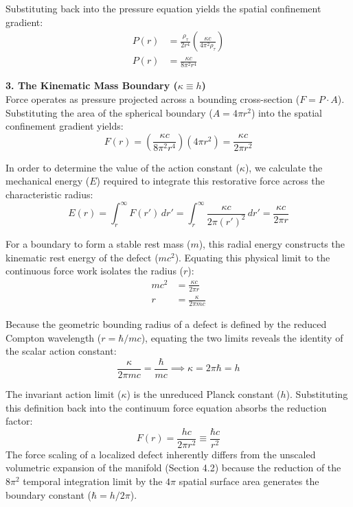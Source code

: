 Substituting back into the pressure equation yields the spatial confinement gradient:
\begin{align}
    P(r) &= \frac{\rho_\tau}{2 r^4} \left( \frac{\kappa c}{4\pi^2 \rho_\tau} \right) \nonumber \\
    P(r) &= \frac{\kappa c}{8\pi^2 r^4}
\end{align}


\textbf{3. The Kinematic Mass Boundary ($\kappa \equiv h$)} \\
Force operates as pressure projected across a bounding cross-section ($F = P \cdot A$). Substituting the area of the spherical boundary ($A = 4\pi r^2$) into the spatial confinement gradient yields:
\begin{equation}
    F(r) = \left( \frac{\kappa c}{8\pi^2 r^4} \right) (4\pi r^2) = \frac{\kappa c}{2\pi r^2}
\end{equation}

In order to determine the value of the action constant ($\kappa$), we calculate the mechanical energy ($E$) required to integrate this restorative force across the characteristic radius: 
\begin{equation}
    E(r) = \int_r^\infty F(r') \, dr' = \int_r^\infty \frac{\kappa c}{2\pi (r')^2} \, dr' = \frac{\kappa c}{2\pi r} 
\end{equation}

For a boundary to form a stable rest mass ($m$), this radial energy constructs the kinematic rest energy of the defect ($mc^2$). Equating this physical limit to the continuous force work isolates the radius ($r$):
\begin{align}
    mc^2 &= \frac{\kappa c}{2\pi r} \nonumber \\
    r &= \frac{\kappa}{2\pi mc}
\end{align}

Because the geometric bounding radius of a defect is defined by the reduced Compton wavelength ($r = \hbar/mc$), equating the two limits reveals the identity of the scalar action constant: 
\begin{equation}
    \frac{\kappa}{2\pi mc} = \frac{\hbar}{mc} \implies \kappa = 2\pi \hbar = h
\end{equation}

The invariant action limit ($\kappa$) is the unreduced Planck constant ($h$). Substituting this definition back into the continuum force equation absorbs the reduction factor:
\begin{equation}
    F(r) = \frac{hc}{2\pi r^2} \equiv \frac{\hbar c}{r^2} \label{eq:fundamental_force_limit}
\end{equation}
The force scaling of a localized defect inherently differs from the unscaled volumetric expansion of the manifold (Section 4.2) because the reduction of the $8\pi^2$ temporal integration limit by the $4\pi$ spatial surface area generates the boundary constant ($\hbar = h/2\pi$).

